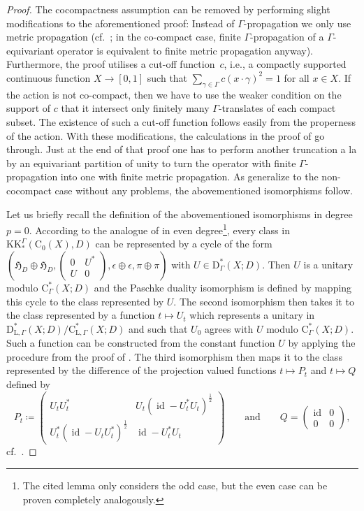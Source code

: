 \documentclass[pdftex]{sigma}
\numberwithin{equation}{section}
\theoremstyle{definition}
\newcommand{\Ct}{\mathrm{C}}
\newcommand{\Cz}{\Ct_0}
\newcommand{\HilbertMod}{\mathfrak{H}}
\DeclareMathOperator{\id}{id}
\newcommand{\KK}{\mathrm{KK}}
\newcommand{\Roe}{\mathrm{C}^*}
\newcommand{\PseudoLoc}{\mathrm{D}^*}
\newcommand{\Loc}{\mathrm{C}^*_{\mathrm{L},\Gamma}}
\newcommand{\PseudoLocLoc}{\mathrm{D}^*_{\mathrm{L},\Gamma}}
\begin{document}
\begin{proof}
The cocompactness assumption can be removed by performing slight modifications to the aforementioned proof: Instead of $\Gamma$-propagation we only use metric propagation (cf.\ \cite[items~(ii) and~(iii) on p.~74]{GueWillYu_DyncomplKtheory}; in the co-compact case, finite $\Gamma$-propagation of a $\Gamma$-equivariant operator is equivalent to finite metric propagation anyway).
Furthermore, the proof utilises a cut-off function~$c$, i.e., a compactly supported continuous function $X\to [0,1]$ such that $\sum_{\gamma\in \Gamma}c(x\cdot\gamma)^2=1$ for all $x\in X$. If the action is not co-compact, then we have to use the weaker condition on the support of $c$ that it intersect only finitely many $\Gamma$-translates of each compact subset. The existence of such a cut-off function follows easily from the properness of the action.
With these modifications, the calculations in the proof of \cite[Lemma~B.7]{GueWillYu_DyncomplKtheory} go through. Just at the end of that proof one has to perform another truncation a la \cite[Sublemma~12.3.3]{HigRoe} by an equivariant partition of unity to turn the operator with finite $\Gamma$-propagation into one with finite metric propagation.
As \cite[Lemmas~B.14, B.15 and B.16]{GueWillYu_DyncomplKtheory} generalize to the non-cocompact case without any problems, the abovementioned isomorphisms follow.

Let us briefly recall the definition of the abovementioned isomorphisms in degree $p=0$.
According to the analogue of \cite[Lemma B.7]{GueWillYu_DyncomplKtheory} in even degree\footnote{The cited lemma only considers the odd case, but the even case can be proven completely analogously.}, every class in $\KK_*^\Gamma(\Cz(X),D)$ can be represented by a cycle of the form $\left(\HilbertMod_D\oplus\HilbertMod_D,\left(\begin{smallmatrix}0&U^*\\U&0\end{smallmatrix}\right)\!,\epsilon\oplus\epsilon,\pi\oplus\pi\right)$ with $U\in \PseudoLoc_\Gamma(X;D)$.
Then $U$ is a unitary modulo $\Roe_\Gamma(X;D)$ and the Paschke duality isomorphism is defined by mapping this cycle to the class represented by $U$. The second isomorphism then takes it to the class represented by a function $t\mapsto U_t$ which represents a unitary in $\PseudoLocLoc(X;D)/\Loc(X;D)$ and such that $U_0$ agrees with $U$ modulo $\Roe_\Gamma(X;D)$. Such a function can be constructed from the constant function $U$ by applying the procedure from the proof of \cite[Lemma~B.15]{GueWillYu_DyncomplKtheory}.
The third isomorphism then maps it to the class represented by the difference of the projection valued functions $t\mapsto P_t$ and $t\mapsto Q$ defined by
\[
P_t\coloneqq \begin{pmatrix}U_tU_t^*&U_t(\id-U_t^*U_t)^{\frac12} \\U_t^*(\id-U_tU_t^*)^{\frac12}&\id-U_t^*U_t\end{pmatrix}\qquad\text{and}\qquad Q=\begin{pmatrix}\id&0\\0&0\end{pmatrix}\!,
\]
cf.\ \cite[Proposition~4.8.10]{HigRoe}.


\end{proof}
\end{document}
